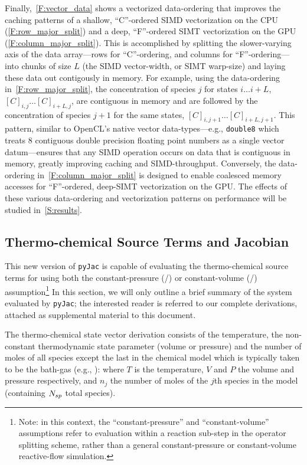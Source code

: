 \documentclass[12pt,number,sort&compress,preprint]{elsarticle}
\begin{document}
Finally,~\cref{F:vector_data} shows a vectorized data-ordering that improves the caching patterns of a shallow, ``C''-ordered SIMD vectorization on the CPU (\cref{F:row_major_split}) and a deep, ``F''-ordered SIMT vectorization on the GPU (\cref{F:column_major_split}).
This is accomplished by splitting the slower-varying axis of the data array---rows for ``C''-ordering, and columns for ``F''-ordering---into chunks of size $L$ (the SIMD vector-width, or SIMT warp-size) and laying these data out contigously in memory.
For example, using the data-ordering in~\cref{F:row_major_split}, the concentration of species $j$ for states $i\ldots i+L$, $[C]_{i, j} \ldots [C]_{i + L, j}$, are contiguous in memory and are followed by the concentration of species $j + 1$ for the same states, $[C]_{i, j + 1} \ldots [C]_{i + L, j + 1}$.
This pattern, similar to OpenCL's native vector data-types---e.g., \texttt{double\num{8}} which treats \num{8} contiguous double precision floating point numbers as a single vector datum---ensures that any SIMD operation occurs on data that is contiguous in memory, greatly improving caching and SIMD-throughput.
Conversely, the data-ordering in~\cref{F:column_major_split} is designed to enable coalesced memory accesses for ``F''-ordered, deep-SIMT vectorization on the GPU.
The effects of these various data-ordering and vectorization patterns on performance will be studied in~\cref{S:results}.

\subsection{Thermo-chemical Source Terms and Jacobian}
This new version of \texttt{pyJac} is capable of evaluating the thermo-chemical source terms for using both the constant-pressure (\conp/) or constant-volume (\conv/) assumption\footnote{Note: in this context, the ``constant-pressure'' and ``constant-volume'' assumptions refer to evaluation within a reaction sub-step in the operator splitting scheme, rather than a general constant-pressure or constant-volume reactive-flow simulation.}
In this section, we will only outline a brief summary of the system evaluated by \texttt{pyJac}; the interested reader is referred to our complete derivations, attached as supplemental material to this document.

The thermo-chemical state vector derivation consists of the temperature, the non-constant thermodynamic state parameter (volume or pressure) and the number of moles of all species except the last in the chemical model which is typically taken to be the bath-gas (e.g., ):
where $T$ is the temperature, $V$ and $P$ the volume and pressure respectively, and $n_j$ the number of moles of the $j$th species in the model (containing $\ns/$ total species).
\end{document}

